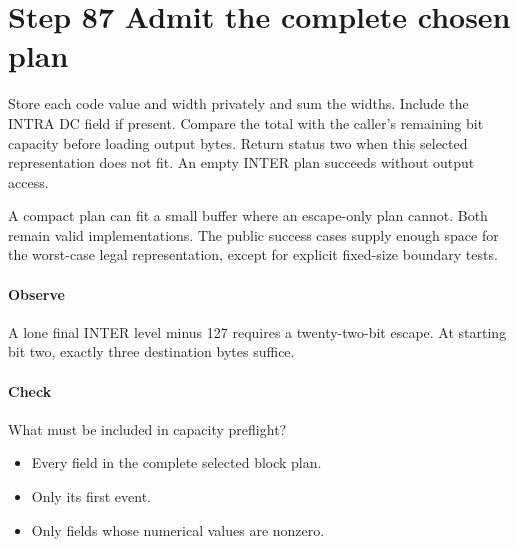 \section{Step 87 Admit the complete chosen plan}\label{h263-coeff-s07}
Store each code value and width privately and sum the widths. Include the INTRA
DC field if present. Compare the total with the caller's remaining bit capacity
before loading output bytes. Return status two when this selected representation
does not fit. An empty INTER plan succeeds without output access.

A compact plan can fit a small buffer where an escape-only plan cannot. Both
remain valid implementations. The public success cases supply enough space for
the worst-case legal representation, except for explicit fixed-size boundary tests.

\paragraph{Observe} A lone final INTER level minus 127 requires a twenty-two-bit
escape. At starting bit two, exactly three destination bytes suffice.
\paragraph{Check} What must be included in capacity preflight?
\begin{itemize}
  \item[A.] Every field in the complete selected block plan.
  \item[B.] Only its first event.
  \item[C.] Only fields whose numerical values are nonzero.
\end{itemize}
